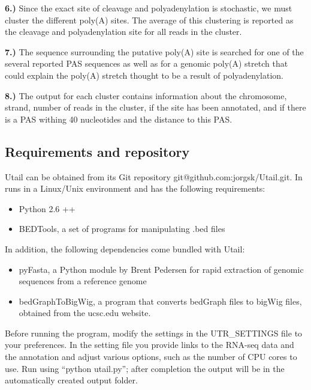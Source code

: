 \textbf{6.)} Since the exact site of cleavage and polyadenylation is stochastic,
we must cluster the different poly(A) sites. The average of this clustering is
reported as the cleavage and polyadenylation site for all reads in the cluster.

\textbf{7.)} The sequence surrounding the putative poly(A) site is searched for
one of the several reported PAS sequences as well as for a genomic poly(A)
stretch that could explain the poly(A) stretch thought to be a result of
polyadenylation.

\textbf{8.)} The output for each cluster contains information about the
chromosome, strand, number of reads in the cluster, if the site has been
annotated, and if there is a PAS withing 40 nucleotides and the distance to
this PAS.

\subsection{Requirements and repository}
Utail can be obtained from its Git repository git@github.com:jorgsk/Utail.git.
In runs in a Linux/Unix environment and has the following requirements:
\begin{itemize}
	\item Python 2.6 ++
	\item BEDTools, a set of programs for manipulating .bed files
		\cite{quinlan_bedtools:_2010}
\end{itemize}
In addition, the following dependencies come bundled with Utail:
\begin{itemize}
	\item pyFasta, a Python module by Brent Pedersen for rapid extraction of
		genomic sequences from a reference genome
	\item bedGraphToBigWig, a program that converts bedGraph files to bigWig
		files, obtained from the ucsc.edu website.
\end{itemize}
Before running the program, modify the settings in the UTR\_SETTINGS file to
your preferences. In the setting file you provide links to the RNA-seq data and
the annotation and adjust various options, such as the number of CPU cores to
use. Run using ``python utail.py''; after completion the output will be in the
automatically created output folder.
